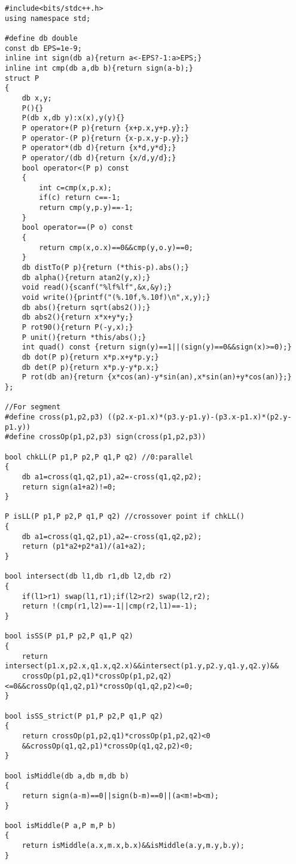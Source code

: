\begin{lstlisting}
#include<bits/stdc++.h>
using namespace std;

#define db double
const db EPS=1e-9;
inline int sign(db a){return a<-EPS?-1:a>EPS;}
inline int cmp(db a,db b){return sign(a-b);}
struct P
{
    db x,y;
    P(){}
    P(db x,db y):x(x),y(y){}
    P operator+(P p){return {x+p.x,y+p.y};}
    P operator-(P p){return {x-p.x,y-p.y};}
    P operator*(db d){return {x*d,y*d};}
    P operator/(db d){return {x/d,y/d};}
    bool operator<(P p) const
    {
        int c=cmp(x,p.x);
        if(c) return c==-1;
        return cmp(y,p.y)==-1;
    }
    bool operator==(P o) const
    {
        return cmp(x,o.x)==0&&cmp(y,o.y)==0;
    }
    db distTo(P p){return (*this-p).abs();}
    db alpha(){return atan2(y,x);}
    void read(){scanf("%lf%lf",&x,&y);}
    void write(){printf("(%.10f,%.10f)\n",x,y);}
    db abs(){return sqrt(abs2());}
    db abs2(){return x*x+y*y;}
    P rot90(){return P(-y,x);}
    P unit(){return *this/abs();}
    int quad() const {return sign(y)==1||(sign(y)==0&&sign(x)>=0);}
    db dot(P p){return x*p.x+y*p.y;}
    db det(P p){return x*p.y-y*p.x;}
    P rot(db an){return {x*cos(an)-y*sin(an),x*sin(an)+y*cos(an)};}
};

//For segment
#define cross(p1,p2,p3) ((p2.x-p1.x)*(p3.y-p1.y)-(p3.x-p1.x)*(p2.y-p1.y))
#define crossOp(p1,p2,p3) sign(cross(p1,p2,p3))

bool chkLL(P p1,P p2,P q1,P q2) //0:parallel
{
    db a1=cross(q1,q2,p1),a2=-cross(q1,q2,p2);
    return sign(a1+a2)!=0;
}

P isLL(P p1,P p2,P q1,P q2) //crossover point if chkLL()
{
    db a1=cross(q1,q2,p1),a2=-cross(q1,q2,p2);
    return (p1*a2+p2*a1)/(a1+a2);
}

bool intersect(db l1,db r1,db l2,db r2)
{
    if(l1>r1) swap(l1,r1);if(l2>r2) swap(l2,r2);
    return !(cmp(r1,l2)==-1||cmp(r2,l1)==-1);
}

bool isSS(P p1,P p2,P q1,P q2)
{
    return intersect(p1.x,p2.x,q1.x,q2.x)&&intersect(p1.y,p2.y,q1.y,q2.y)&&
    crossOp(p1,p2,q1)*crossOp(p1,p2,q2)<=0&&crossOp(q1,q2,p1)*crossOp(q1,q2,p2)<=0;
}

bool isSS_strict(P p1,P p2,P q1,P q2)
{
    return crossOp(p1,p2,q1)*crossOp(p1,p2,q2)<0
    &&crossOp(q1,q2,p1)*crossOp(q1,q2,p2)<0;
}

bool isMiddle(db a,db m,db b)
{
    return sign(a-m)==0||sign(b-m)==0||(a<m!=b<m);
}

bool isMiddle(P a,P m,P b)
{
    return isMiddle(a.x,m.x,b.x)&&isMiddle(a.y,m.y,b.y);
}


\end{lstlisting}
